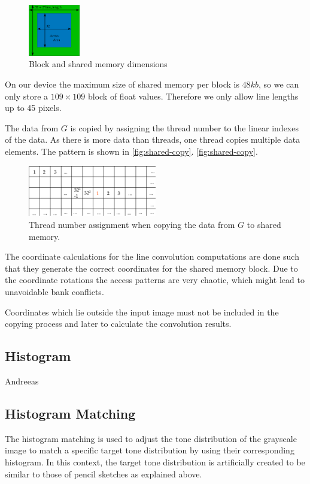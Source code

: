 \begin{figure}[htb]
  \centering
  \includegraphics[width=0.2\textwidth]{images/shared-memory.png}
  \caption{Block and shared memory dimensions}
  \label{fig:shared-memory}
\end{figure}

On our device the maximum size of shared memory per block is $48kb$, so we can
only store a $109\times109$ block of float values. Therefore we only allow line
lengths up to 45 pixels.

The data from $G$ is copied by assigning the thread number to the linear
indexes of the data. As there is more data than threads, one thread copies
multiple data elements. The pattern is shown in \autoref{fig:shared-copy}.
\autoref{fig:shared-copy}.
\begin{figure}[htb]
  \centering
  \includegraphics[width=0.5\textwidth]{images/shared-copy.png}
  \caption{Thread number assignment when copying the data from $G$ to shared memory.}
  \label{fig:shared-copy}
\end{figure}

The coordinate calculations for the line convolution computations are done such
that they generate the correct coordinates for the shared memory block. Due to
the coordinate rotations the access patterns are very chaotic, which might lead
to unavoidable bank conflicts.

Coordinates which lie outside the input image must not be included in the
copying process and later to calculate the convolution results.



\subsection{Histogram}
Andreeas

\subsection{Histogram Matching}
The histogram matching is used to adjust the tone distribution of the 
grayscale image to match a specific target tone distribution by using
their corresponding histogram. In this context, the target tone
distribution is artificially created to be similar to those of pencil
sketches as explained above.

